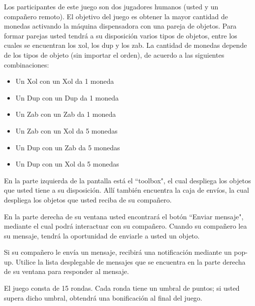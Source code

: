 \documentclass{article}
\begin{document}
\begin{multicols}{2}{
\noindent Los participantes de este juego son dos jugadores humanos (usted y un compañero remoto). El objetivo del juego es obtener la mayor cantidad de monedas activando la máquina dispensadora con una pareja de objetos. Para formar parejas usted tendrá a su disposición varios tipos de objetos, entre los cuales se encuentran los xol, los dup y los zab. La cantidad de monedas depende de los tipos de objeto (sin importar el orden), de acuerdo a las siguientes combinaciones:
%
\begin{itemize}
\item Un Xol con un Xol da 1 moneda
\item Un Dup con un Dup da 1 moneda
\item Un Zab con un Zab da 1 moneda
\item Un Zab con un Xol da 5 monedas
\item Un Dup con un Zab da 5 monedas
\item Un Dup con un Xol da 5 monedas
\end{itemize}
%
En la parte izquierda de la pantalla está el ``toolbox", el cual despliega los objetos que usted tiene a su disposición. Allí también encuentra la caja de envíos, la cual despliega los objetos que usted reciba de su compañero.

\vspace{0.5\baselineskip}

\noindent En la parte derecha de su ventana usted encontrará el botón ``Enviar mensaje", mediante el cual podrá interactuar con su compañero. Cuando su compañero lea su mensaje, tendrá la oportunidad de enviarle a usted un objeto.

\vspace{0.5\baselineskip}

\noindent Si su compañero le envía un mensaje, recibirá una notificación mediante un pop-up. Utilice la lista desplegable de mensajes que se encuentra en la parte derecha de su ventana para responder al mensaje.

\vspace{0.5\baselineskip}

\noindent El juego consta de 15 rondas. Cada ronda tiene un umbral de puntos; si usted supera dicho umbral, obtendrá una bonificación al final del juego.
}\end{multicols}
\end{document}

